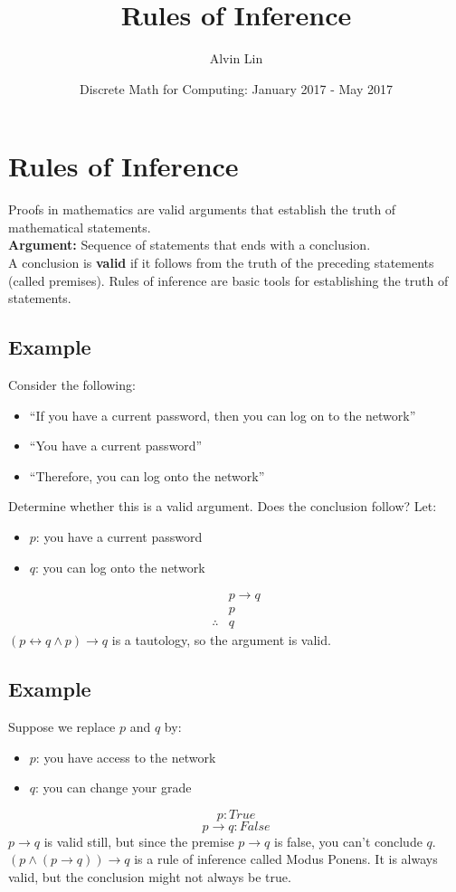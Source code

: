 \documentclass{math}
\title{Rules of Inference}
\author{Alvin Lin}
\date{Discrete Math for Computing: January 2017 - May 2017}
\begin{document}
\maketitle

\section*{Rules of Inference}
Proofs in mathematics are valid arguments that establish the truth of
mathematical statements. \\
\textbf{Argument:} Sequence of statements that ends with a conclusion. \\
A conclusion is \textbf{valid} if it follows from the truth of the preceding
statements (called premises). Rules of inference are basic tools for
establishing the truth of statements.

\subsection*{Example}
Consider the following:
\begin{itemize}
  \item ``If you have a current password, then you can log on to the network''
  \item ``You have a current password''
  \item ``Therefore, you can log onto the network''
\end{itemize}
Determine whether this is a valid argument. Does the conclusion follow? Let:
\begin{itemize}
  \item \( p \): you have a current password
  \item \( q \): you can log onto the network
\end{itemize}
\begin{align*}
  & p \to q \\
  & p \\
  \therefore & q
\end{align*}
\( (p \leftrightarrow q \wedge p) \to q \) is a tautology, so the argument is
valid.

\subsection*{Example}
Suppose we replace \( p \) and \( q \) by:
\begin{itemize}
  \item \( p \): you have access to the network
  \item \( q \): you can change your grade
\end{itemize}
\[ p: True \]
\[ p \to q: False \]
\( p \to q \) is valid still, but since the premise \( p \to q \) is false, you
can't conclude \( q \). \( (p \wedge (p \to q)) \to q \) is a rule of inference
called Modus Ponens. It is always valid, but the conclusion might not always be
true.
\end{document}
